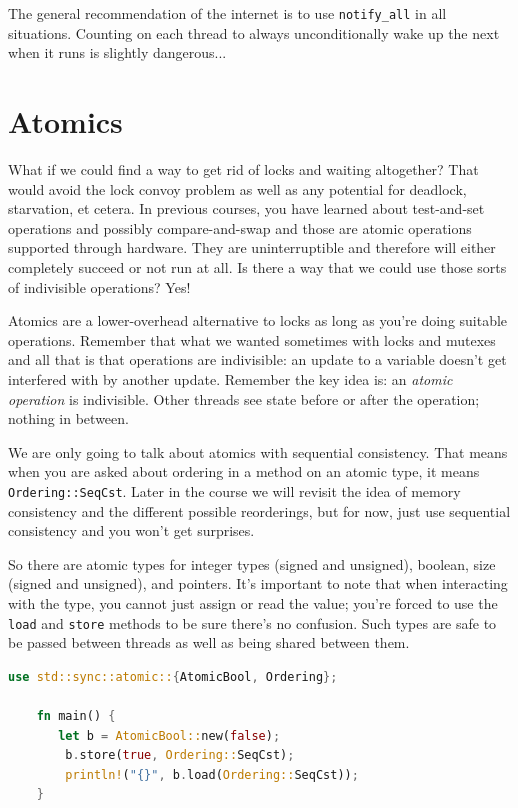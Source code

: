 The general recommendation of the internet is to use \texttt{notify\_all} in all situations. Counting on each thread to always unconditionally wake up the next when it runs is slightly dangerous...

\section*{Atomics}
What if we could find a way to get rid of locks and waiting altogether? That would avoid the lock convoy problem as well as any potential for deadlock, starvation, et cetera. In previous courses, you have learned about test-and-set operations and possibly compare-and-swap and those are atomic operations supported through hardware. They are uninterruptible and therefore will either completely succeed or not run at all. Is there a way that we could use those sorts of indivisible operations? Yes!

Atomics are a lower-overhead alternative to
locks as long as you're doing suitable operations. Remember that what we wanted sometimes with locks and mutexes and all that is that operations are indivisible: an update to a variable doesn't get interfered with by another update. Remember the key idea is: an \textit{atomic operation} is indivisible. Other threads see state before or after the operation; nothing in between.

We are only going to talk about atomics with sequential consistency. That means when you are asked about ordering in a method on an atomic type, it means \texttt{Ordering::SeqCst}. Later in the course we will revisit the idea of memory consistency and the different possible reorderings, but for now, just use sequential consistency and you won't get surprises.

So there are atomic types for integer types (signed and unsigned), boolean, size (signed and unsigned), and pointers. It's important to note that when interacting with the type, you cannot just assign or read the value; you're forced to use the \texttt{load} and \texttt{store} methods to be sure there's no confusion. Such types are safe to be passed between threads as well as being shared between them. 

\begin{lstlisting}[language=Rust]
    use std::sync::atomic::{AtomicBool, Ordering};

    fn main() {
       let b = AtomicBool::new(false);
        b.store(true, Ordering::SeqCst);
        println!("{}", b.load(Ordering::SeqCst));
    }
\end{lstlisting}

